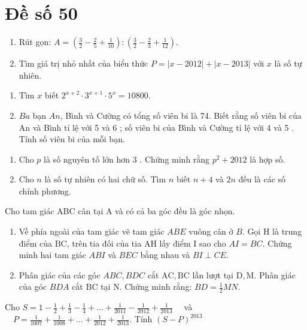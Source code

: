 \section{Đề số 50}

\begin{bt} 
	\hfill
	\begin{enumerate}[1.]
		\item Rút gọn: $A=\left(\frac{3}{2}-\frac{2}{5}+\frac{1}{10}\right):\left(\frac{3}{2}-\frac{2}{3}+\frac{1}{12}\right)$.
		\item Tìm giá trị nhỏ nhất của biểu thức $P=|x-2012|+|x-2013|$ với $x$ là số tự nhiên.
	\end{enumerate}
	\loigiai{} 
\end{bt}

\begin{bt}
	\hfill
	\begin{enumerate}[1.]
		\item Tìm $x$ biết $2^{x+2} \cdot 3^{x+1} \cdot 5^x=10800$.
		\item $B a$ bạn $A n$, Bình và Cường có tổng số viên bi là 74. Biết rằng số viên bi của An và Bình tỉ lệ với 5 và 6 ; số viên bi của Bình và Cường tỉ lệ với 4 và 5 . Tính số viên bi của mỗi bạn.
	\end{enumerate}
		\loigiai{} 
\end{bt}
	
\begin{bt}
		\hfill
		\begin{enumerate}[1.]
			\item Cho $p$ là số nguyên tố lớn hơn 3 . Chứng minh rằng $p^2+2012$ là hợp số.
			\item Cho $n$ là số tự nhiên có hai chữ số. Tìm $n$ biết $n+4$ và $2 n$ đều là các số chính phương.
		\end{enumerate}
		
		\loigiai{} 
\end{bt}
\begin{bt}
	Cho tam giác $\mathrm{ABC}$ cân tại $\mathrm{A}$ và có cả ba góc đều là góc nhọn.
	\begin{enumerate}[1.]
		\item Về phía ngoài của tam giác vẽ tam giác $A B E$ vuông cân ở $B$. Gọi $\mathrm{H}$ là trung điểm của $\mathrm{BC}$, trên tia đối của tia $\mathrm{AH}$ lấy điểm $\mathrm{I}$ sao cho $A I=B C$. Chứng minh hai tam giác $A B I$ và $B E C$ bằng nhau và $B I \perp C E$.
		\item Phân giác của các góc $A B C, B D C$ cắt $\mathrm{AC}, \mathrm{BC}$ lần lượt tại $\mathrm{D}, \mathrm{M}$. Phân giác của góc $B D A$ cắt $\mathrm{BC}$ tại $\mathrm{N}$. Chứng minh rằng: $B D=\frac{1}{2} M N$.
	\end{enumerate}
	\loigiai{}
\end{bt}

\begin{bt}
	Cho $S=1-\frac{1}{2}+\frac{1}{3}-\frac{1}{4}+\ldots+\frac{1}{2011}-\frac{1}{2012}+\frac{1}{2013} \quad$ và $\quad P=\frac{1}{1007}+\frac{1}{1008}+\ldots+\frac{1}{2012}+\frac{1}{2013}$. Tính $(S-P)^{2013}$
	\loigiai{} 
\end{bt}
	
